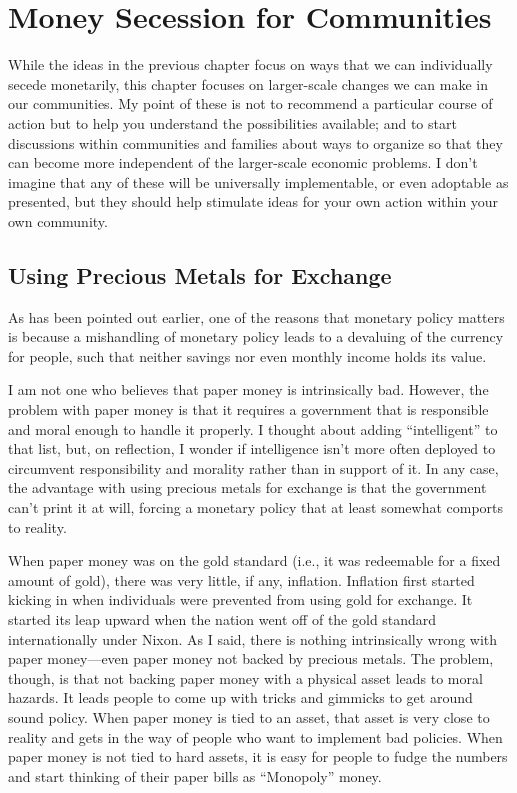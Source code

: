 \chapter{Money Secession for Communities}

While the ideas in the previous chapter focus on ways that we can
individually secede monetarily, this chapter focuses on
larger-scale changes we can make in our communities. My point of these is not to recommend
a particular course of action but to help you understand the
possibilities available; and to start discussions within communities
and families about ways to organize so that they can become more
independent of the larger-scale economic problems. I don’t imagine that
any of these will be universally implementable, or even adoptable as
presented, but they should help stimulate ideas for your own action
within your own community.

\section{Using Precious Metals for Exchange}

As has been pointed out
earlier, one of the reasons that monetary policy matters is because a
mishandling of monetary policy leads to a devaluing of the currency for
people, such that neither savings nor even monthly income holds its
value.

I am not one who believes that paper money is intrinsically bad.
However, the problem with paper money is that it requires a government
that is responsible and moral enough to handle it properly. I thought
about adding ``intelligent'' to that list, but, on reflection, I wonder
if intelligence isn’t more often deployed to circumvent responsibility
and morality rather than in support of it. In any case, the advantage
with using precious metals for exchange is that the government can’t
print it at will, forcing a monetary policy that at least somewhat
comports to reality.

When paper money was on the gold standard (i.e., it was redeemable for a
fixed amount of gold), there was very little, if any, inflation.
Inflation first started kicking in when individuals were prevented from
using gold for exchange. It started its leap upward when the nation
went off of the gold standard internationally under Nixon. As I said,
there is nothing intrinsically wrong with paper money—even paper money
not backed by precious metals. The problem, though, is that not backing
paper money with a physical asset leads to moral hazards. It leads
people to come up with tricks and gimmicks to get around sound policy.
When paper money is tied to an asset, that asset is very close to
reality and gets in the way of people who want to implement bad
policies. When paper money is not tied to hard assets, it is easy for
people to fudge the numbers and start thinking of their paper bills as
``Monopoly'' money.

